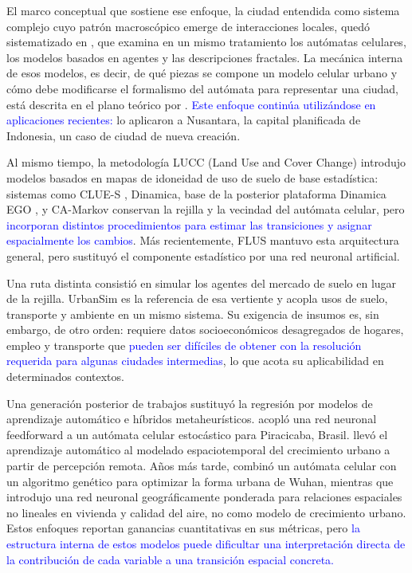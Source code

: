 El marco conceptual que sostiene ese enfoque, la ciudad entendida como sistema
complejo cuyo patrón macroscópico emerge de interacciones locales, quedó
sistematizado en \textcite{Batty2005}, que examina en un mismo tratamiento los
autómatas celulares, los modelos basados en agentes y las descripciones
fractales. La mecánica interna de esos modelos, es decir, de qué piezas se
compone un modelo celular urbano y cómo debe modificarse el formalismo del
autómata para representar una ciudad, está descrita en el plano teórico por
\textcite{Torrens2000}. \textcolor{blue}{Este enfoque continúa utilizándose en
aplicaciones recientes:} \textcite{Arfiansyah2024} lo aplicaron a Nusantara,
la capital planificada de Indonesia, un caso de ciudad de nueva creación.

Al mismo tiempo, la metodología LUCC (Land Use and Cover Change) introdujo
modelos basados en mapas de idoneidad de uso de suelo de base estadística:
sistemas como CLUE-S \parencite{Verburg2002}, Dinamica, base de la posterior
plataforma Dinamica EGO \parencite{SoaresFilho2002}, y CA-Markov conservan la
rejilla y la vecindad del autómata celular, pero \textcolor{blue}{incorporan
distintos procedimientos para estimar las transiciones y asignar espacialmente
los cambios}. Más recientemente, FLUS \parencite{Liu2017} mantuvo esta
arquitectura general, pero sustituyó el componente estadístico por una red
neuronal artificial.

Una ruta distinta consistió en simular los agentes del mercado de suelo en
lugar de la rejilla. UrbanSim \parencite{Waddell2002} es la referencia de esa
vertiente y acopla usos de suelo, transporte y ambiente en un mismo sistema.
Su exigencia de insumos es, sin embargo, de otro orden: requiere datos
socioeconómicos desagregados de hogares, empleo y transporte que
\textcolor{blue}{pueden ser difíciles de obtener con la resolución requerida
para algunas ciudades intermedias}, lo que acota su aplicabilidad en
determinados contextos.

Una generación posterior de trabajos sustituyó la regresión por modelos de
aprendizaje automático e híbridos metaheurísticos.
\textcite{almeida2008stochastic} acopló una red neuronal feedforward a un
autómata celular estocástico para Piracicaba, Brasil.
\textcite{Gomez2020} llevó el aprendizaje automático al modelado espaciotemporal
del crecimiento urbano a partir de percepción remota. Años más tarde,
\textcite{Wang2021} combinó un autómata celular con un algoritmo genético para
optimizar la forma urbana de Wuhan, mientras que
\textcite{Hagenauer2022} introdujo una red neuronal geográficamente ponderada
para relaciones espaciales no lineales en vivienda y calidad del aire, no como
modelo de crecimiento urbano. Estos enfoques reportan ganancias cuantitativas
en sus métricas, pero \textcolor{blue}{la estructura interna de estos modelos
puede dificultar una interpretación directa de la contribución de cada variable
a una transición espacial concreta.}

